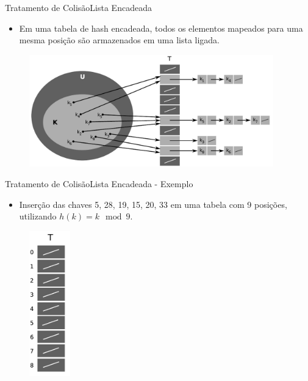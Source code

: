 \documentclass[aspectratio=169]{beamer}
\begin{document}

\begin{frame}{Tratamento de Colisão}{Lista Encadeada}
\begin{itemize}
 \item Em uma tabela de hash encadeada, todos os elementos mapeados para uma mesma posição são armazenados em uma lista ligada.
\end{itemize}
\begin{figure}[!h]
  \centering
  \includegraphics[width=300pt]{imagens/lista_encadeada.png}
  \label{fig_lista_encadeada}
\end{figure}
\end{frame}


\begin{frame}{Tratamento de Colisão}{Lista Encadeada - Exemplo}
\begin{itemize}
 \item Inserção das chaves {5, 28, 19, 15, 20, 33} em uma tabela com 9 posições, utilizando $h(k) = k \mod 9$.
\end{itemize}
\begin{figure}[!h]
  \centering
  \includegraphics[width=50pt]{imagens/ex_encadeada1.png}
  \label{fig_ex_encadeada1}
\end{figure}
\end{frame}
\end{document}
